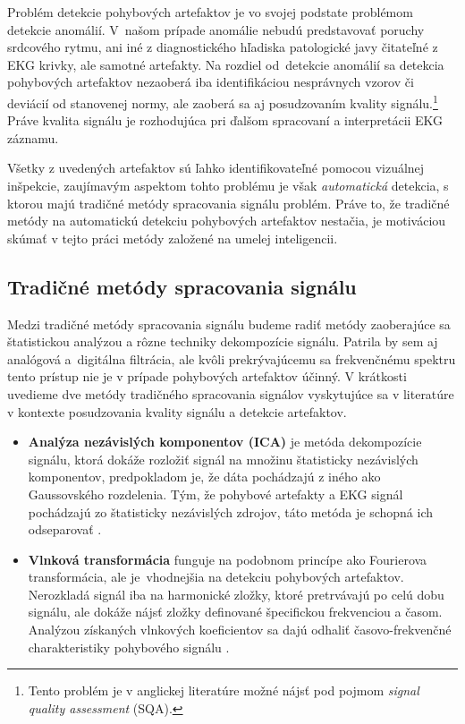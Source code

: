 Problém detekcie pohybových artefaktov je vo svojej podstate problémom detekcie anomálií. V~našom prípade anomálie nebudú predstavovať poruchy srdcového rytmu, ani iné z diagnostického hľadiska patologické javy čitateľné z EKG krivky, ale samotné artefakty. Na rozdiel od~detekcie anomálií sa detekcia pohybových artefaktov nezaoberá iba identifikáciou nesprávnych vzorov či deviácií od stanovenej normy, ale zaoberá sa aj posudzovaním kvality signálu.\footnote{Tento problém je v anglickej literatúre možné nájsť pod pojmom \textit{signal quality assessment} (SQA).} Práve kvalita signálu je rozhodujúca pri ďalšom spracovaní a interpretácii EKG záznamu.

Všetky z uvedených artefaktov sú ľahko identifikovateľné pomocou vizuálnej inšpekcie, zaujímavým aspektom tohto problému je však \textit{automatická} detekcia, s ktorou majú tradičné metódy spracovania signálu problém. Práve to, že tradičné metódy na automatickú detekciu pohybových artefaktov nestačia, je motiváciou skúmať v tejto práci metódy založené na umelej inteligencii.

\subsection{Tradičné metódy spracovania signálu}

Medzi tradičné metódy spracovania signálu budeme radiť metódy zaoberajúce sa štatistickou analýzou a rôzne techniky dekompozície signálu. Patrila by sem aj analógová a~digitálna filtrácia, ale kvôli prekrývajúcemu sa frekvenčnému spektru tento prístup nie je v prípade pohybových artefaktov účinný. V krátkosti uvedieme dve metódy tradičného spracovania signálov vyskytujúce sa v literatúre v kontexte posudzovania kvality signálu a detekcie artefaktov.

\begin{itemize}
    \item \textbf{Analýza nezávislých komponentov (ICA)} je metóda dekompozície signálu, ktorá dokáže rozložiť signál na množinu štatisticky nezávislých komponentov, predpokladom je, že dáta pochádzajú z iného ako Gaussovského rozdelenia. Tým, že pohybové artefakty a EKG signál pochádzajú zo štatisticky nezávislých zdrojov, táto metóda je schopná ich odseparovať \cite{Milanesi2007}.
    \item \textbf{Vlnková transformácia} funguje na podobnom princípe ako Fourierova transformácia, ale je~vhodnejšia na detekciu pohybových artefaktov. Nerozkladá signál iba na harmonické zložky, ktoré pretrvávajú po celú dobu signálu, ale dokáže nájsť zložky definované špecifickou frekvenciou a časom. Analýzou získaných vlnkových koeficientov sa dajú odhaliť časovo-frekvenčné charakteristiky pohybového signálu \cite{Bhoraniya2014}.
\end{itemize}

